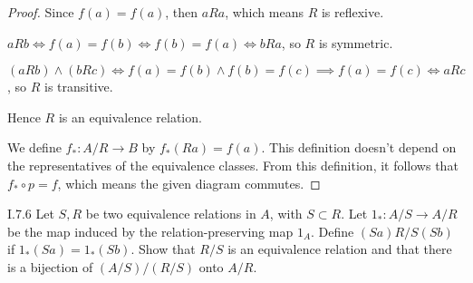 \begin{proof}
	Since \( f(a) = f(a) \), then \( aRa \), which means \( R \) is reflexive.

	\( aRb \iff f(a) = f(b) \iff f(b) = f(a) \iff bRa \), so \( R \) is symmetric.

	\( (aRb) \land (bRc) \iff f(a) = f(b) \land f(b) = f(c) \implies f(a) = f(c) \iff aRc \), so \( R \) is transitive.

	Hence \( R \) is an equivalence relation.

	We define \( f_{\ast}: A/R \to B \) by \( f_{\ast}(Ra) = f(a) \). This definition doesn't depend on the representatives of the equivalence classes. From this definition, it follows that \( f_{\ast} \circ p = f \), which means the given diagram commutes.
\end{proof}

\begin{problem}{I.7.6}\label{problem:I.7.6}
Let \( S, R \) be two equivalence relations in \( A \), with \( S \subset R \). Let \( 1_{\ast} : A/S \to A/R \) be the map induced by the relation-preserving map \( 1_{A} \). Define \( (Sa) R/S (Sb) \) if \( 1_{\ast}(Sa) = 1_{\ast}(Sb) \). Show that \( R/S \) is an equivalence relation and that there is a bijection of \( (A/S)/(R/S) \) onto \( A/R \).
\end{problem}

